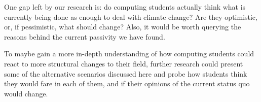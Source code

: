 One gap left by our research is: do computing students actually think what is currently being done as enough to deal with climate change? Are they optimistic, or, if pessimistic, what should change? Also, it would be worth querying the reasons behind the current passivity we have found.

To maybe gain a more in-depth understanding of how computing students could react to more structural changes to their field, further research could present some of the alternative scenarios discussed here and probe how students think they would fare in each of them, and if their opinions of the current status quo would change.




